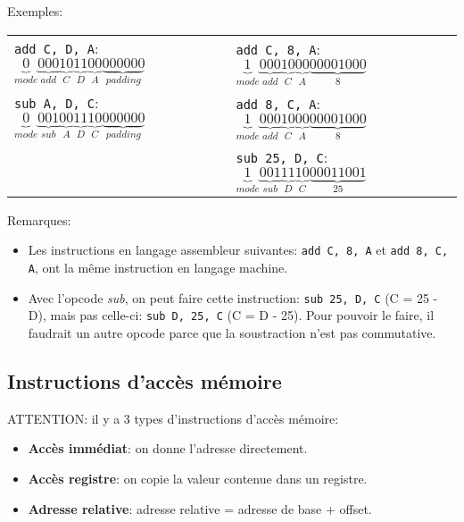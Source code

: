 \documentclass[a4paper]{article}
\begin{document}
\begin{example}
    Exemples: \\
    \begin{tabular}{p{7.75cm}p{7.5cm}}
        \texttt{add C, D, A}: $ \underbrace{0}_{mode} \underbrace{000}_{add} \underbrace{10}_{C} \underbrace{11}_{D} \underbrace{00}_{A} \underbrace{000000}_{padding} $
        &
        \texttt{add C, 8, A}: $ \underbrace{1}_{mode} \underbrace{000}_{add} \underbrace{10}_{C} \underbrace{00}_{A} \underbrace{00001000}_{8} $
        \\
        \texttt{sub A, D, C}: $ \underbrace{0}_{mode} \underbrace{001}_{sub} \underbrace{00}_{A} \underbrace{11}_{D} \underbrace{10}_{C} \underbrace{000000}_{padding} $
        &
        \texttt{add 8, C, A}: $ \underbrace{1}_{mode} \underbrace{000}_{add} \underbrace{10}_{C} \underbrace{00}_{A} \underbrace{00001000}_{8} $
        \\
        & \texttt{sub 25, D, C}: $ \underbrace{1}_{mode} \underbrace{001}_{sub} \underbrace{11}_{D} \underbrace{10}_{C} \underbrace{00011001}_{25} $
    \end{tabular}
\end{example}

Remarques:
\begin{itemize}
    \item Les instructions en langage assembleur suivantes: \texttt{add C, 8, A} et \texttt{add 8, C, A}, ont la même instruction en langage machine.
    \item Avec l'opcode \textit{sub}, on peut faire cette instruction: \texttt{sub 25, D, C} (C = 25 - D), mais pas celle-ci: \texttt{sub D, 25, C} (C = D - 25). Pour pouvoir le faire, il faudrait un autre opcode parce que la soustraction n'est pas commutative.
\end{itemize}





\subsection{Instructions d'accès mémoire}

ATTENTION: il y a 3 types d'instructions d'accès mémoire:
\begin{itemize}
    \item \textbf{Accès immédiat}: on donne l'adresse directement.
    \item \textbf{Accès registre}: on copie la valeur contenue dans un registre.
    \item \textbf{Adresse relative}: adresse relative = adresse de base + offset.
\end{itemize}
\end{document}
